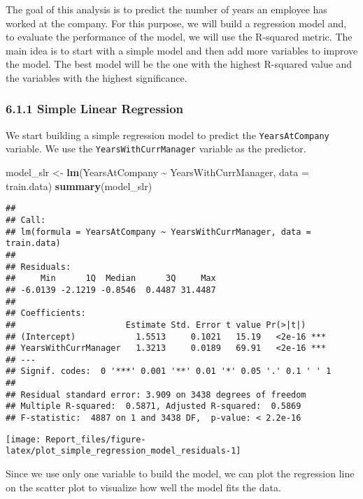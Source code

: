 \documentclass[
]{article}
\newenvironment{Shaded}{\begin{snugshade}}{\end{snugshade}}
\newcommand{\AttributeTok}[1]{\textcolor[rgb]{0.13,0.29,0.53}{#1}}
\newcommand{\FunctionTok}[1]{\textcolor[rgb]{0.13,0.29,0.53}{\textbf{#1}}}
\newcommand{\NormalTok}[1]{#1}
\newcommand{\OtherTok}[1]{\textcolor[rgb]{0.56,0.35,0.01}{#1}}
\newcommand{\SpecialCharTok}[1]{\textcolor[rgb]{0.81,0.36,0.00}{\textbf{#1}}}
\begin{document}
The goal of this analysis is to predict the number of years an employee
has worked at the company. For this purpose, we will build a regression
model and, to evaluate the performance of the model, we will use the
R-squared metric. The main idea is to start with a simple model and then
add more variables to improve the model. The best model will be the one
with the highest R-squared value and the variables with the highest
significance.

\hypertarget{simple-linear-regression}{%
\subsubsection{6.1.1 Simple Linear
Regression}\label{simple-linear-regression}}

We start building a simple regression model to predict the
\texttt{YearsAtCompany} variable. We use the
\texttt{YearsWithCurrManager} variable as the predictor.

\begin{Shaded}
\begin{Highlighting}[]
\NormalTok{model\_slr }\OtherTok{\textless{}{-}} \FunctionTok{lm}\NormalTok{(YearsAtCompany }\SpecialCharTok{\textasciitilde{}}\NormalTok{ YearsWithCurrManager, }\AttributeTok{data =}\NormalTok{ train.data)}
\FunctionTok{summary}\NormalTok{(model\_slr)}
\end{Highlighting}
\end{Shaded}

\begin{verbatim}
## 
## Call:
## lm(formula = YearsAtCompany ~ YearsWithCurrManager, data = train.data)
## 
## Residuals:
##     Min      1Q  Median      3Q     Max 
## -6.0139 -2.1219 -0.8546  0.4487 31.4487 
## 
## Coefficients:
##                      Estimate Std. Error t value Pr(>|t|)    
## (Intercept)            1.5513     0.1021   15.19   <2e-16 ***
## YearsWithCurrManager   1.3213     0.0189   69.91   <2e-16 ***
## ---
## Signif. codes:  0 '***' 0.001 '**' 0.01 '*' 0.05 '.' 0.1 ' ' 1
## 
## Residual standard error: 3.909 on 3438 degrees of freedom
## Multiple R-squared:  0.5871, Adjusted R-squared:  0.5869 
## F-statistic:  4887 on 1 and 3438 DF,  p-value: < 2.2e-16
\end{verbatim}

\begin{center}\texttt{[image: Report\_files/figure-latex/plot\_simple\_regression\_model\_residuals-1]} \end{center}

Since we use only one variable to build the model, we can plot the
regression line on the scatter plot to visualize how well the model fits
the data.
\end{document}
